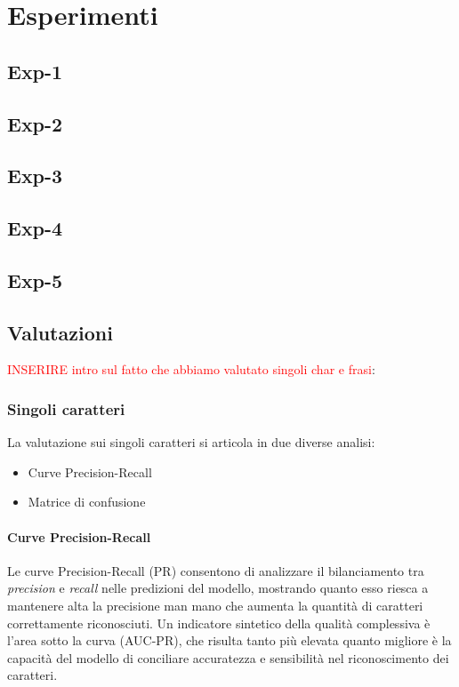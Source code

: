 \chapter{Esperimenti}
\section{Exp-1}
\section{Exp-2}
\section{Exp-3}
\section{Exp-4}
\section{Exp-5}

\section{Valutazioni}
\textcolor{red}{INSERIRE intro sul fatto che abbiamo valutato singoli char e frasi}:

\subsection{Singoli caratteri}
La valutazione sui singoli caratteri si articola in due diverse analisi:
\begin{itemize}
    \item Curve Precision-Recall
    \item Matrice di confusione
\end{itemize}

\subsubsection*{Curve Precision-Recall}
Le curve Precision-Recall (PR) consentono di analizzare il bilanciamento tra \emph{precision} e \emph{recall} nelle predizioni del modello, mostrando quanto esso riesca a mantenere alta la precisione man mano che aumenta la quantità di caratteri correttamente riconosciuti. Un indicatore sintetico della qualità complessiva è l'area sotto la curva (AUC-PR), che risulta tanto più elevata quanto migliore è la capacità del modello di conciliare accuratezza e sensibilità nel riconoscimento dei caratteri.


